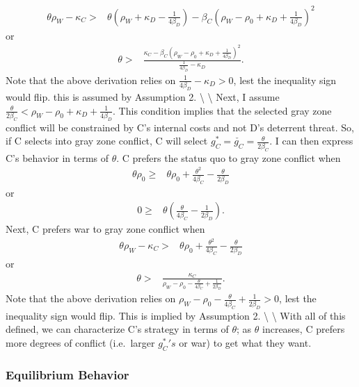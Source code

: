 \documentclass[
]{article}
\begin{document}
\begin{align*}
\theta\rho_{W}-\kappa_{C}> & \theta\left(\rho_{W}+\kappa_{D}-\frac{1}{4\beta_{D}}\right)-\beta_{C}\left(\rho_{W}-\rho_{0}+\kappa_{D}+\frac{1}{4\beta_{D}}\right)^{2}
\end{align*} or \begin{align*}
\theta> & \frac{\kappa_{C}-\beta_{C}\left(\rho_{W}-\rho_{0}+\kappa_{D}+\frac{1}{4\beta_{D}}\right)^{2}}{\frac{1}{4\beta_{D}}-\kappa_{D}}.
\end{align*} Note that the above derivation relies on
\(\frac{1}{4\beta_{D}}-\kappa_{D}>0\), lest the inequality sign would
flip. this is assumed by Assumption 2. \textbackslash{} \textbackslash{}
Next, I assume
\(\frac{\theta}{2\beta_{C}}<\rho_{W}-\rho_{0}+\kappa_{D}+\frac{1}{4\beta_{D}}\).
This condition implies that the selected gray zone conflict will be
constrained by C's internal costs and not D's deterrent threat. So, if C
selects into gray zone conflict, C will select
\(g_{C}^{*}=\check{g_{C}}=\frac{\theta}{2\beta_{C}}\). I can then
express C's behavior in terms of \(\theta\). C prefers the status quo to
gray zone conflict when \begin{align*}
\theta\rho_{0}\geq & \theta\rho_{0}+\frac{\theta^{2}}{4\beta_{C}}-\frac{\theta}{2\beta_{D}}
\end{align*} or \begin{align*}
0\geq & \theta\left(\frac{\theta}{4\beta_{C}}-\frac{1}{2\beta_{D}}\right).
\end{align*} Next, C prefers war to gray zone conflict when
\begin{align*}
\theta\rho_{W}-\kappa_{C}> & \theta\rho_{0}+\frac{\theta^{2}}{4\beta_{C}}-\frac{\theta}{2\beta_{D}}
\end{align*} or \begin{align*}
\theta> & \frac{\kappa_{C}}{\rho_{W}-\rho_{0}-\frac{\theta}{4\beta_{C}}+\frac{1}{2\beta_{D}}}.
\end{align*} Note that the above derivation relies on
\(\rho_{W}-\rho_{0}-\frac{\theta}{4\beta_{C}}+\frac{1}{2\beta_{D}}>0\),
lest the inequality sign would flip. This is implied by Assumption 2.
\textbackslash{} \textbackslash{} With all of this defined, we can
characterize C's strategy in terms of \(\theta\); as \(\theta\)
increases, C prefers more degrees of conflict (i.e.~larger
\(g_{C}^{*}'s\) or war) to get what they want.

\hypertarget{equilibrium-behavior}{%
\subsubsection{Equilibrium Behavior}\label{equilibrium-behavior}}
\end{document}
